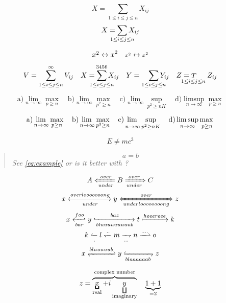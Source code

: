 \documentclass{article}
\newcommand{\horz}{\noindent\makebox[\linewidth]{\rule{\paperwidth}{0.4pt}}}
\begin{document}
\[
X = \sum_{1\le i\le j\le n} X_{ij}
\]
\[
X = \sum_{\mathclap{1\le i\le j\le n}} X_{ij}
\]

\horz

\[
\cramped{x^2} \leftrightarrow x^2 \quad
\cramped[\scriptstyle]{x^2} \leftrightarrow {\scriptstyle x^2}
\]

\horz

\[
V = \sum_{1\le i\le j\le n}^{\infty} V_{ij} \quad
X = \smashoperator{\sum_{1\le i\le j\le n}^{3456}} X_{ij} \quad
Y = \smashoperator[r]{\sum\limits_{1\le i\le j\le n}} Y_{ij} \quad
Z = \smashoperator[l]{\mathop{T}_{1\le i\le j\le n}} Z_{ij}
\]

\horz

\[
\text{a)} \lim_{n\to\infty} \max_{p\ge n} \quad
\text{b)} \lim_{n\to\infty} \max_{p^2\ge n} \quad
\text{c)} \lim_{n\to\infty} \sup_{p^2\ge nK} \quad
\text{d)} \limsup_{n\to\infty} \max_{p\ge n}
\]

\[
\text{a)} \adjustlimits\lim_{n\to\infty} \max_{p\ge n} \quad
\text{b)} \adjustlimits\lim_{n\to\infty} \max_{p^2\ge n} \quad
\text{c)} \adjustlimits\lim_{n\to\infty} \sup_{p^2\ge nK} \quad
\text{d)} \adjustlimits\limsup_{n\to\infty} \max_{p\ge n}
\]

\horz

\begin{equation}
E \neq m c^3
\end{equation}

\horz

\begin{quote}\renewcommand*\rmdefault{ppl}\normalfont\itshape
\begin{equation*}
a=b \label{eq:example}\tag*{Q\&A}
\end{equation*}
See \ref{eq:example} or is it better with ?
\end{quote}

\horz

\[
A \xLeftarrow[under]{over} B \xRightarrow[under]{over} C
\]
\[
x \xleftrightarrow[under]{overlooooooong} y \xLeftrightarrow[underloooooooong]{over} z
\]
\[
x \xhookleftarrow[bar]{foo} y \xhookrightarrow[bluuuuuuuuub]{baz} t \xmapsto{heeereee} k
\]
\[
k \xleftharpoonup[.]{} l \xleftharpoondown{..} m \xrightharpoondown[...]{} n \xrightharpoonup{....} o
\]
\[
x \xrightleftharpoons{bluuuuub} y \xleftrightharpoons[blaaaaaab]{} z
\]

\horz

\[
z = \LaTeXoverbrace{
   \underbracket{x}_\text{real} + i
      \underbracket[1pt][7pt]{y}_\text{imaginary}
        }^\text{complex number}
\quad
\underbrace{1+1}_{=2}
\]
\end{document}
